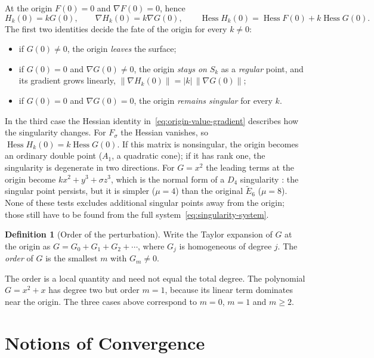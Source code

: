 \documentclass[12pt, a4paper, oneside]{book}
\theoremstyle{plain}
\theoremstyle{definition}
\newtheorem{definition}[theorem]{Definition}
\theoremstyle{remark}
\begin{document}
At the origin $F(0)=0$ and $\nabla F(0)=0$, hence
\begin{equation}
\label{eq:origin-value-gradient}
H_k(0)=kG(0),\qquad
\nabla H_k(0)=k\nabla G(0),\qquad
\operatorname{Hess}H_k(0)=\operatorname{Hess}F(0)+k\operatorname{Hess}G(0).
\end{equation}
The first two identities decide the fate of the origin for every $k\neq0$:
\begin{itemize}
    \item if $G(0)\neq0$, the origin \emph{leaves} the surface;
    \item if $G(0)=0$ and $\nabla G(0)\neq0$, the origin \emph{stays on} $S_k$
          as a \emph{regular} point, and its gradient grows linearly,
          $\|\nabla H_k(0)\|=|k|\,\|\nabla G(0)\|$;
    \item if $G(0)=0$ and $\nabla G(0)=0$, the origin \emph{remains singular}
          for every $k$.
\end{itemize}
In the third case the Hessian identity in~\eqref{eq:origin-value-gradient}
describes how the singularity changes. For $F_\sigma$ the Hessian vanishes, so
$\operatorname{Hess}H_k(0)=k\operatorname{Hess}G(0)$. If this matrix is
nonsingular, the origin becomes an ordinary double point ($A_1$, a quadratic
cone); if it has rank one, the singularity is degenerate in two directions. For
$G=x^2$ the leading terms at the origin become $kx^2+y^3+\sigma z^3$, which is
the normal form of a $D_4$ singularity \cite{arnold2012singularities}: the
singular point persists, but it is simpler ($\mu=4$) than the original
$\tilde{E}_6$ ($\mu=8$). None of these tests excludes additional singular
points away from the origin; those still have to be found from the full
system~\eqref{eq:singularity-system}.

\begin{definition}[Order of the perturbation]
\label{def:order}
Write the Taylor expansion of $G$ at the origin as
$G=G_0+G_1+G_2+\cdots$, where $G_j$ is homogeneous of degree $j$. The
\emph{order} of $G$ is the smallest $m$ with $G_m\neq0$.
\end{definition}

The order is a local quantity and need not equal the total degree. The
polynomial $G=x^2+x$ has degree two but order $m=1$, because its linear term
dominates near the origin. The three cases above correspond to $m=0$, $m=1$ and
$m\ge2$.

\section{Notions of Convergence}
\label{sec:convergence-notions}
\end{document}
